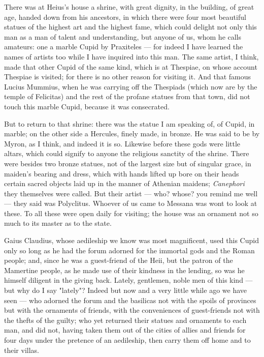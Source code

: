  There was at Heius's house a shrine, with great dignity, in the building, of great age, handed down from his ancestors, in which there were four most beautiful statues of the highest art and the highest fame, which could delight not only this man as a man of talent and understanding, but anyone of us, whom he calls amateurs: one a marble Cupid by Praxiteles --- for indeed I have learned the names of artists too while I have inquired into this man. The same artist, I think, made that other Cupid of the same kind, which is at Thespiae, on whose account Thespiae is visited; for there is no other reason for visiting it. And that famous Lucius Mummius, when he was carrying off the Thespiads (which now are by the temple of Felicitas) and the rest of the profane statues from that town, did not touch this marble Cupid, because it was consecrated.

 But to return to that shrine: there was the statue I am speaking of, of Cupid, in marble; on the other side a Hercules, finely made, in bronze. He was said to be by Myron, as I think, and indeed it is so. Likewise before these gods were little altars, which could signify to anyone the religious sanctity of the shrine. There were besides two bronze statues, not of the largest size but of singular grace, in maiden's bearing and dress, which with hands lifted up bore on their heads certain sacred objects laid up in the manner of Athenian maidens; \textit{Canephori} they themselves were called. But their artist --- who? whose? you remind me well --- they said was Polyclitus. Whoever of us came to Messana was wont to look at these. To all these were open daily for visiting; the house was an ornament not so much to its master as to the state.

 Gaius Claudius, whose aedileship we know was most magnificent, used this Cupid only so long as he had the forum adorned for the immortal gods and the Roman people; and, since he was a guest-friend of the Heii, but the patron of the Mamertine people, as he made use of their kindness in the lending, so was he himself diligent in the giving back. Lately, gentlemen, noble men of this kind --- but why do I say "lately"? Indeed but now and a very little while ago we have seen --- who adorned the forum and the basilicas not with the spoils of provinces but with the ornaments of friends, with the conveniences of guest-friends not with the thefts of the guilty; who yet returned their statues and ornaments to each man, and did not, having taken them out of the cities of allies and friends for four days under the pretence of an aedileship, then carry them off home and to their villas.

